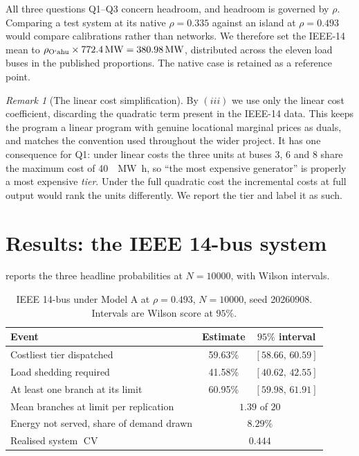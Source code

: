 \documentclass[11pt,a4paper]{article}
\theoremstyle{definition}
\theoremstyle{plain}
\theoremstyle{remark}
\newtheorem{remark}[definition]{Remark}
\newcommand{\CV}{\operatorname{CV}}
\newcommand{\okina}{\textquoteleft}
\begin{document}
All three questions Q1--Q3 concern headroom, and headroom is governed by $\rho$.
Comparing a test system at its native $\rho = 0.335$ against an island at
$\rho = 0.493$ would compare calibrations rather than networks. We therefore set
the IEEE-14 mean to $\rho_{\text{O\okina ahu}} \times \SI{772.4}{\mega\watt} =
\SI{380.98}{\mega\watt}$, distributed across the eleven load buses in the
published proportions. The native case is retained as a reference point.

\begin{remark}[The linear cost simplification]\label{rem:linear-cost}
By $(iii)$ we use only the linear cost coefficient, discarding
the quadratic term present in the IEEE-14 data. This keeps the program a linear
program with genuine locational marginal prices as duals, and matches the
convention used throughout the wider project. It has one consequence for Q1: under
linear costs the three units at buses 3, 6 and 8 share the maximum cost of
\SI{40}{\per\mega\watt\hour}, so ``the most expensive generator'' is properly a
most expensive \emph{tier}. Under the full quadratic cost the incremental costs at
full output would rank the units differently. We report the tier and label it as
such.
\end{remark}

\section{Results: the IEEE 14-bus system}\label{sec:results14}

 reports the three headline probabilities at $N = \num{10000}$,
with Wilson intervals.

\begin{table}[t]
\centering
\caption{IEEE 14-bus under Model A at $\rho = 0.493$, $N = \num{10000}$,
seed \num{20260908}. Intervals are Wilson score at $95\%$.}
\label{tab:q2}
\begin{tabular}{lcc}
\toprule
Event & Estimate & $95\%$ interval \\
\midrule
Costliest tier dispatched            & 59.63\% & $[58.66,\,60.59]$ \\
Load shedding required               & 41.58\% & $[40.62,\,42.55]$ \\
At least one branch at its limit     & 60.95\% & $[59.98,\,61.91]$ \\
\midrule
Mean branches at limit per replication & \multicolumn{2}{c}{$1.39$ of $20$} \\
Energy not served, share of demand drawn & \multicolumn{2}{c}{$8.29\%$} \\
Realised system $\CV$ & \multicolumn{2}{c}{$0.444$} \\
\bottomrule
\end{tabular}
\end{table}
\end{document}
